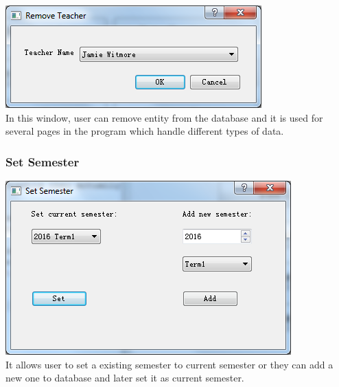 \includegraphics[scale=0.5]{pics/remove.png}\\
In this window, user can remove entity from the database and it is used for several pages in the program which handle different types of data.\\

\subsubsection{Set Semester}
\includegraphics[scale=0.5]{pics/set_semester.png}\\
It allows user to set a existing semester to current semester or they can add a new one to database and later set it as current semester.

